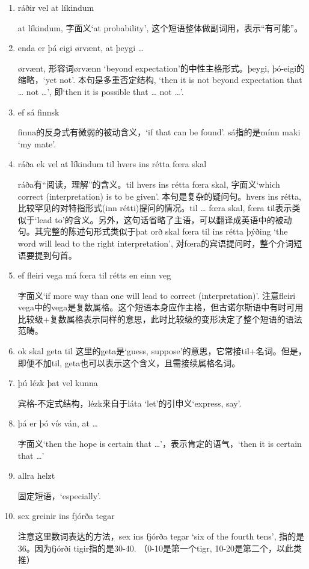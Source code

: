 \begin{grammar*}{}
  \begin{enumerate}[leftmargin=*]
    \item ráðir vel at líkindum

          at líkindum, 字面义`at probability', 这个短语整体做副词用，表示“有可能”。

    \item enda er þá eigi ørvænt, at þeygi {\dots}

          ørvænt, 形容词ørvænn `beyond expectation'的中性主格形式。þeygi, þó-eigi的缩略，`yet not'. 本句是多重否定结构, `then it is not beyond expectation that {\dots} not {\dots}', 即`then it is possible that {\dots} not {\dots}'.

    \item ef sá finnsk

          finna的反身式有微弱的被动含义，`if that can be found'. sá指的是mínn maki `my mate'.

    \item ráða ek vel at líkindum til hvers ins rétta fœra skal

          ráða有“阅读，理解”的含义。til hvers ins rétta fœra skal, 字面义`which correct (interpretation) is to be given'. 本句是复杂的疑问句。hvers ins rétta, 比较罕见的对特指形式(inn rétti)提问的情况。til {\dots} fœra skal, fœra til表示类似于`lead to'的含义。另外，这句话省略了主语，可以翻译成英语中的被动句。其完整的陈述句形式类似于þat orð skal fœra til ins rétta þýðing `the word will lead to the right interpretation', 对fœra的宾语提问时，整个介词短语要提到句首。

    \item ef fleiri vega má fœra til rétts en einn veg

          字面义`if more way than one will lead to correct (interpretation)'. 注意fleiri vega中的vega是复数属格。这个短语本身应作主格，但古诺尔斯语中有时可用比较级+复数属格表示同样的意思，此时比较级的变形决定了整个短语的语法范畴。
    \item ok skal geta til
          这里的geta是`guess, suppose'的意思，它常接til+名词。但是，即便不加til, geta也可以表示这个含义，且需接续属格名词。
    \item þú lézk þat vel kunna

          宾格-不定式结构，lézk来自于láta `let'的引申义`express, say'.

    \item þá er þó vís ván, at {\dots}

          字面义`then the hope is certain that {\dots}'，表示肯定的语气，`then it is certain that {\dots}'

    \item allra helzt

          固定短语，`especially'.

    \item sex greinir ins fjórða tegar

          注意这里数词表达的方法，sex ins fjórða tegar `six of the fourth tens', 指的是36。因为fjórði tigir指的是30-40. （0-10是第一个tigr, 10-20是第二个，以此类推）
  \end{enumerate}
\end{grammar*}
